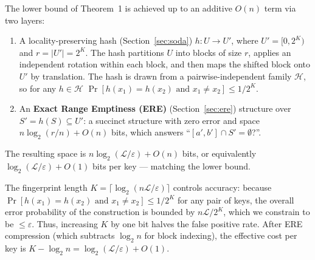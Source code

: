 %
%
%
%

\begin{theorem}
The lower bound of Theorem~1 is achieved up to an additive $O(n)$ term
via two layers:
\begin{enumerate}
    \item A locality-preserving hash (Section~\ref{sec:soda}) $h\colon U \to U'$, where $U' = [0, 2^K)$ and $r = |U'| = 2^K$.
    The hash partitions $U$ into blocks of size $r$, applies an independent rotation
    within each block, and then maps the shifted block onto $U'$ by translation.
    The hash is drawn from a pairwise-independent family $\mathcal{H}$,
    so for any $h \in \mathcal{H}$ $\Pr[h(x_1) = h(x_2) \text{ and } x_1 \neq x_2] \leq 1/2^K$.

    \item An \textbf{Exact Range Emptiness (ERE)} (Section~\ref{sec:ere}) structure over $S' = h(S) \subseteq U'$:
    a succinct structure with zero error and space $n \log_2(r/n) + O(n)$ bits, which answers ``$[a', b'] \cap S' = \emptyset$?''.
\end{enumerate}
\end{theorem}

The resulting space is $n \log_2(\mathcal{L}/\varepsilon) + O(n)$ bits, or equivalently
$\log_2(\mathcal{L}/\varepsilon) + O(1)$ bits per key --- matching the lower bound.

The fingerprint length $K = \lceil\log_2(n\mathcal{L}/\varepsilon)\rceil$ controls accuracy:
because $\Pr[h(x_1) = h(x_2) \text{ and } x_1 \neq x_2] \leq 1/2^K$ for any pair of keys, the overall error
probability of the construction is bounded by $n\mathcal{L}/2^K$, which we constrain to be $\le \varepsilon$.
Thus, increasing $K$ by one bit halves the false positive rate. After ERE compression
(which subtracts $\log_2 n$ for block indexing), the effective cost per key is
$K - \log_2 n = \log_2(\mathcal{L}/\varepsilon) + O(1).$

